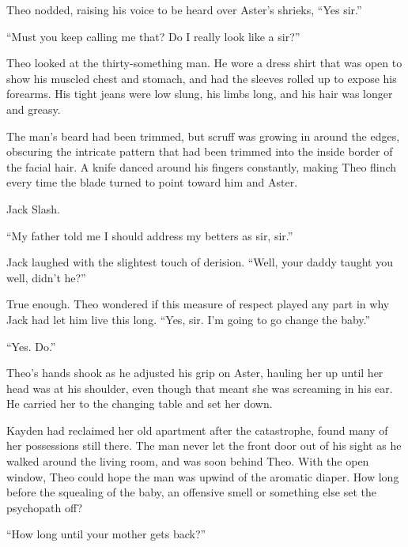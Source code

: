 Theo nodded, raising his voice to be heard over Aster's shrieks, ``Yes sir.''



``Must you keep calling me that?  Do I really look like a sir?''



Theo looked at the thirty-something man.  He wore a dress shirt that was open to show his muscled chest and stomach, and had the sleeves rolled up to expose his forearms.  His tight jeans were low slung, his limbs long, and his hair was longer and greasy.



The man's beard had been trimmed, but scruff was growing in around the edges, obscuring the intricate pattern that had been trimmed into the inside border of the  facial hair.  A knife danced around his fingers constantly, making Theo flinch every time the blade turned to point toward him and Aster.



Jack Slash.



``My father told me I should address my betters as sir, sir.''



Jack laughed with the slightest touch of derision.  ``Well, your daddy taught you well, didn't he?''



True enough.  Theo wondered if this measure of respect played any part in why Jack had let him live this long.  ``Yes, sir.  I'm going to go change the baby.''



``Yes.  Do.''



Theo's hands shook as he adjusted his grip on Aster, hauling her up until her head was at his shoulder, even though that meant she was screaming in his ear.  He carried her to the changing table and set her down.



Kayden had reclaimed her old apartment after the catastrophe, found many of her possessions still there.  The man never let the front door out of his sight as he walked around the living room, and was soon behind Theo.  With the open window, Theo could hope the man was upwind of the aromatic diaper.  How long before the squealing of the baby, an offensive smell or something else set the psychopath off?



``How long until your mother gets back?''




